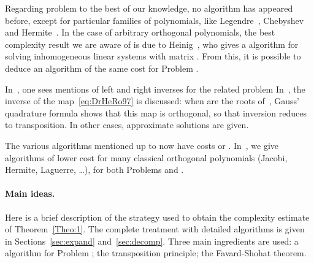 \documentclass{elsart}
\begin{document}
Regarding problem  to the best of our knowledge, no  algorithm has appeared before, except for particular
families of polynomials, like Legendre~\cite{Frumkin95},
Chebyshev~\cite{Pan98} and Hermite~\cite{LeRoCh07}. In the case of
arbitrary orthogonal polynomials, the best complexity result we are
aware of is due to Heinig~\cite{Heinig01}, who gives a
 algorithm for solving inhomogeneous linear systems
with matrix . {}From this, it is possible to
deduce an algorithm of the same cost for Problem .

In~\cite{PoStTa98}, one sees mentions of left and right inverses for
the related problem
 In~\cite{LeRoCh07}, the
inverse of the map~\eqref{eq:DrHeRo97} is discussed: when  are
the roots of~, Gauss' quadrature formula shows that this map is
orthogonal, so that inversion reduces to transposition. In other
cases, approximate solutions are given.

The various algorithms mentioned up to now have costs
 or .  In~\cite{BoSaSc08b}, we
give algorithms of lower cost  for many classical orthogonal
polynomials (Jacobi, Hermite, Laguerre, \dots), for both Problems
 and .



\paragraph*{Main ideas.}
Here is a brief description of the strategy used to obtain the
complexity estimate of Theorem~\ref{Theo:1}. The complete treatment
with detailed algorithms is given in Sections~\ref{sec:expand}
and~\ref{sec:decomp}. Three main ingredients are used:  a
 algorithm for Problem ;  the
transposition principle;  the Favard-Shohat theorem.
\end{document}
